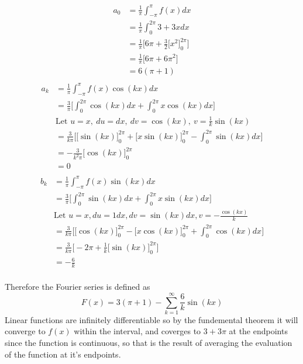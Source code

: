 \documentclass{article}
\begin{document}
\begin{enumerate}
\begin{enumerate}
\begin{multicols}{2}
\noindent
\begin{align*}
    a_0 &= \frac{1}{\pi} \int_{-\pi}^{\pi}f(x) dx \\
    &= \frac{1}{\pi} \int_{0}^{2\pi}3 + 3x dx \\
    &= \frac{1}{\pi} \Bigg[6\pi +  \frac{3}{2}\Big[x^2\Big]^{2\pi}_{0}\Bigg] \\
    &= \frac{1}{\pi} \Bigg[6\pi + 6\pi^2 \Bigg] \\
    &= 6(\pi + 1)\\
\end{align*}
\begin{align*}
    a_k &= \frac{1}{\pi} \int_{-\pi}^{\pi}f(x)\cos(kx) dx \\
    &= \frac{3}{\pi}\Bigg[ \int_{0}^{2\pi}\cos(kx) dx + \int_{0}^{2\pi}x\cos(kx) dx \Bigg] \\
    &\text{Let } u = x,\: du = dx,\: dv = \cos(kx),\: v = \frac{1}{k}\sin(kx) \\
    &= \frac{3}{k\pi}\Bigg[\Big[\sin(kx)\Big]_{0}^{2\pi} + \Big[x \sin(kx)\Big]^{2\pi}_{0} - \int_{0}^{2\pi} \sin(kx) dx\Bigg] \\
    &= -\frac{3}{k^2\pi}\Big[\cos(kx)\Big]_{0}^{2\pi} \\
    &= 0 \\
\end{align*}
\begin{align*}
    b_k &= \frac{1}{\pi} \int_{-\pi}^{\pi}f(x)\sin(kx) dx \\
    &= \frac{3}{\pi}\Bigg[ \int_{0}^{2\pi}\sin(kx) dx + \int_{0}^{2\pi}x\sin(kx) dx \Bigg] \\
    &\text{Let $u = x, du = 1 dx, dv = \sin(kx) dx, v = -\frac{\cos(kx)}{k}$} \\
    &= \frac{3}{k\pi}\Bigg[ \Big[\cos(kx)\Big]_{0}^{2\pi} - \Big[x\cos(kx)\Big]_{0}^{2\pi} + \int_{0}^{2\pi}\cos(kx) dx \Bigg] \\
    &= \frac{3}{k\pi}\Bigg[ -2\pi + \frac{1}{k} \Big[\sin(kx)\Big]_{0}^{2\pi}  \Bigg] \\
    &= -\frac{6}{k}\\ 
    \end{align*} 
    \end{multicols}
    Therefore the Fourier series is defined as 
    \[
        F(x) = 3(\pi + 1) - \sum_{k=1}^{\infty}\frac{6}{k}\sin(kx)
    \]
    Linear functions are infinitely differentiable so by the fundemental theorem it will converge to $f(x)$ within the interval, and coverges to $3+3\pi$ at the endpoints since the function is continuous, so that is the result of averaging the evaluation of the function at it's endpoints.
\end{enumerate}


\end{enumerate}
\end{document}
